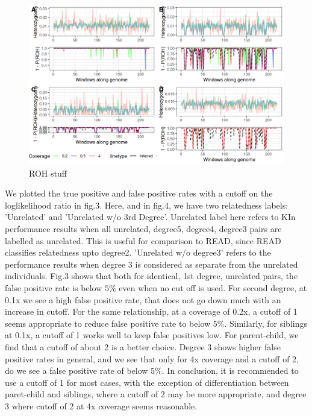 \documentclass[12pt, letterpaper]{article}
\begin{document}
\begin{figure}[htp]
    \centering
    \includegraphics[width=18cm]{plots/plotimg/ROHplot.png}
    \caption{ROH stuff}
    \label{fig:galaxy}
\end{figure}


We plotted the true positive and false positive rates with a cutoff on the loglikelihood ratio in fig.3. Here, and in fig.4, we have two relatedness labels: 'Unrelated' and 'Unrelated w/o 3rd Degree'. Unrelated label here refers to KIn performance results when all unrelated, degree5, degree4, degree3 pairs are labelled as unrelated. This is useful for comparison to READ, since READ classifies relatedness upto degree2. 'Unrelated w/o degree3'  refers to the performance results when degree 3 is considered as separate from the unrelated individuals. Fig.3 shows that both for identical, 1st degree, unrelated pairs, the false positive rate is below $5\%$ even when no cut off is used. For second degree, at 0.1x we see a high false positive rate, that does not go down much with an increase in cutoff. For the same relationship, at a coverage of 0.2x, a cutoff of 1 seems appropriate to reduce false positive rate to below $5\%$. Similarly, for siblings at 0.1x, a cutoff of 1 works well to keep false positives low. For parent-child, we find that a cutoff of about 2 is a better choice. Degree 3 shows higher false positive rates in general, and we see that only for 4x coverage and a cutoff of 2, do we see a false positive rate of below $5\%$. In conclusion, it is recommended to use a cutoff of 1 for most cases, with the exception of differentiation between paret-child and siblings, where a cutoff of 2 may be more appropriate, and degree 3 where cutoff of 2 at 4x coverage seems reasonable. 
\end{document}
